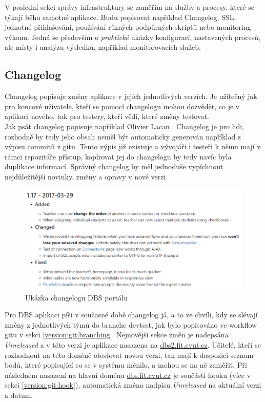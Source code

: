 V poslední sekci správy infrastruktury se zaměřím na služby a procesy, které se týkají běhu samotné aplikace. Budu popisovat například Changelog, SSL, jednotné přihlašování, používání různých podpůrných skriptů nebo monitoring výkonu. Jedná se především o \emph{praktické} ukázky konfigurací, nastavených procesů, ale místy i analýzu výsledků, například monitorovacích služeb.

\subsection{Changelog} \label{app:changelog}

Changelog popisuje změny aplikace v jejích jednotlivých verzích. Je užitečný jak pro koncové uživatele, kteří se pomocí changelogu mohou dozvědět, co je v aplikaci nového, tak pro testery, kteří vědí, které změny testovat.\\
Jak psát changelog popisuje například Olivier Lacan \cite{changelog}. Changelog je pro lidi, rozhodně by tedy jeho obsah neměl být automaticky generován například z výpisu commitů z gitu. Tento výpis již existuje a vývojáři i testeři k němu mají v rámci repozitáře přístup, kopírovat jej do changelogu by tedy navíc byla duplikace informací. Správný changelog by měl jednoduše vypíchnout nejdůležitější novinky, změny a opravy v nové verzi.\\
\begin{figure}[H]
\includegraphics[width=\textwidth]{../png/changelog.png}
\caption{Ukázka changelogu DBS portálu} \label{picture:changelog}
\end{figure}
Pro DBS aplikaci píši v současné době changelog já, a to ve chvíli, kdy se slévají změny z jednotlivých týmů do branche devtest, jak bylo popisováno ve workflow gitu v sekci \ref{version:git:branching}. Nejnovější sekce změn je nadepsána \emph{Unreleased} a v této verzi je aplikace nasazena na \url{dbs2.fit.cvut.cz}. Učitelé, kteří se rozhodnout na této doméně otestovat novou verzi, tak mají k dospozici seznam bodů, které popisující co se v systému měnilo, a mohou se na ně zaměřit. Při následném nasazení na hlavní doménu \url{dbs.fit.cvut.cz} je součástí  hooku (více v sekci \ref{version:git:hook}), automatická změna nadpisu \emph{Unreleased} na aktuální verzi a datum.

